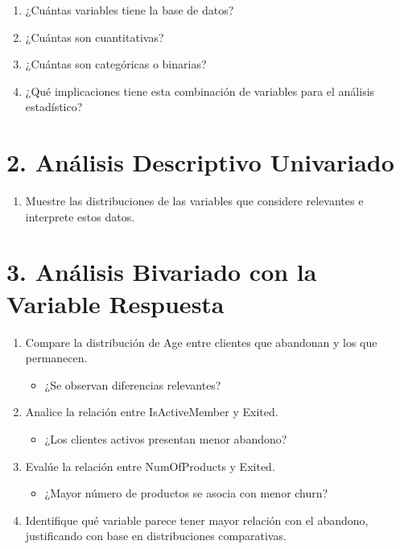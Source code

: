 \documentclass[
]{article}
\providecommand{\tightlist}{%
  \setlength{\itemsep}{0pt}\setlength{\parskip}{0pt}}
\begin{document}
\begin{enumerate}
\def\labelenumi{\arabic{enumi}.}
\tightlist
\item
  ¿Cuántas variables tiene la base de datos?
\item
  ¿Cuántas son cuantitativas?
\item
  ¿Cuántas son categóricas o binarias?
\item
  ¿Qué implicaciones tiene esta combinación de variables para el
  análisis estadístico?
\end{enumerate}

\section{2. Análisis Descriptivo
Univariado}\label{anuxe1lisis-descriptivo-univariado}

\begin{enumerate}
\def\labelenumi{\arabic{enumi}.}
\setcounter{enumi}{4}
\tightlist
\item
  Muestre las distribuciones de las variables que considere relevantes e
  interprete estos datos.
\end{enumerate}

\section{3. Análisis Bivariado con la Variable
Respuesta}\label{anuxe1lisis-bivariado-con-la-variable-respuesta}

\begin{enumerate}
\def\labelenumi{\arabic{enumi}.}
\setcounter{enumi}{5}
\tightlist
\item
  Compare la distribución de Age entre clientes que abandonan y los que
  permanecen.

  \begin{itemize}
  \tightlist
  \item
    ¿Se observan diferencias relevantes?
  \end{itemize}
\item
  Analice la relación entre IsActiveMember y Exited.

  \begin{itemize}
  \tightlist
  \item
    ¿Los clientes activos presentan menor abandono?
  \end{itemize}
\item
  Evalúe la relación entre NumOfProducts y Exited.

  \begin{itemize}
  \tightlist
  \item
    ¿Mayor número de productos se asocia con menor churn?
  \end{itemize}
\item
  Identifique qué variable parece tener mayor relación con el abandono,
  justificando con base en distribuciones comparativas.
\end{enumerate}
\end{document}
